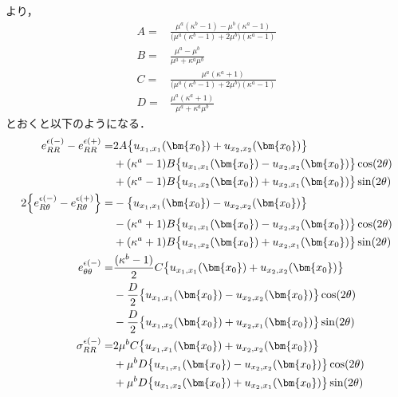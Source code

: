 より，
\begin{align}
	A=&\frac{\mu^{a}(\kappa^{b}-1)-\mu^{b}(\kappa^{a}-1)}
	{\bigl(\mu^{a}(\kappa^{b}-1)+2\mu^{b}\bigr)(\kappa^{a}-1)}
	\nonumber
	\\
	B=&\frac{\mu^{a}-\mu^{b}}
	{\mu^{a}+\kappa^{a}\mu^{b}}
	\nonumber
	\\
	C=&\frac{\mu^{a}(\kappa^{a}+1)}
	{\bigl(\mu^{a}(\kappa^{b}-1)+2\mu^{b}\bigr)(\kappa^{a}-1)}
	\nonumber
	\\
	D=&\frac{\mu^{a}(\kappa^{a}+1)}
	{\mu^{a}+\kappa^{a}\mu^{b}}
	\label{eq:eThThOutEpsSol}
\end{align}
とおくと以下のようになる．
\begin{align}
	e_{RR}^{\epsilon(-)}-e_{RR}^{\epsilon(+)}
		=&2A\bigl\{u_{x_{1},x_{1}}(\bm{x_{0}})+u_{x_{2},x_{2}}(\bm{x_{0}})\bigr\}
		\nonumber
		\\
		&+(\kappa^{a}-1)B\bigl\{u_{x_{1},x_{1}}(\bm{x_{0}})-u_{x_{2},x_{2}}(\bm{x_{0}})\bigr\}\cos(2\theta)
		\nonumber
		\\
		&+(\kappa^{a}-1)B\bigl\{u_{x_{1},x_{2}}(\bm{x_{0}})+u_{x_{2},x_{1}}(\bm{x_{0}})\bigr\}\sin(2\theta)
		\nonumber
		\\
	2\Bigl\{e_{R\theta}^{\epsilon(-)}-e_{R\theta}^{\epsilon(+)}\Bigr\}
		=&-\bigl\{u_{x_{1},x_{1}}(\bm{x_{0}})-u_{x_{2},x_{2}}(\bm{x_{0}})\bigr\}
		\nonumber
		\\
		&-(\kappa^{a}+1)B\bigl\{u_{x_{1},x_{1}}(\bm{x_{0}})-u_{x_{2},x_{2}}(\bm{x_{0}})\bigr\}\cos(2\theta)
		\nonumber
		\\
		&+(\kappa^{a}+1)B\bigl\{u_{x_{1},x_{2}}(\bm{x_{0}})+u_{x_{2},x_{1}}(\bm{x_{0}})\bigr\}\sin(2\theta)
		\nonumber
		\\
	e_{\theta\theta}^{\epsilon(-)}
		=&\frac{(\kappa^{b}-1)}{2}C\bigl\{u_{x_{1},x_{1}}(\bm{x_{0}})+u_{x_{2},x_{2}}(\bm{x_{0}})\bigr\}
		\nonumber
		\\
		&-\frac{D}{2}\bigl\{u_{x_{1},x_{1}}(\bm{x_{0}})-u_{x_{2},x_{2}}(\bm{x_{0}})\bigr\}\cos(2\theta)
		\nonumber
		\\
		&-\frac{D}{2}\bigl\{u_{x_{1},x_{2}}(\bm{x_{0}})+u_{x_{2},x_{1}}(\bm{x_{0}})\bigr\}\sin(2\theta)
		\nonumber
		\\
	\sigma_{RR}^{\epsilon(-)}
		=&2\mu^{b}C\bigl\{u_{x_{1},x_{1}}(\bm{x_{0}})+u_{x_{2},x_{2}}(\bm{x_{0}})\bigr\}
		\nonumber
		\\
		&+\mu^{b}D\bigl\{u_{x_{1},x_{1}}(\bm{x_{0}})-u_{x_{2},x_{2}}(\bm{x_{0}})\bigr\}\cos(2\theta)
		\nonumber
		\\
		&+\mu^{b}D\bigl\{u_{x_{1},x_{2}}(\bm{x_{0}})+u_{x_{2},x_{1}}(\bm{x_{0}})\bigr\}\sin(2\theta)

\end{align}
